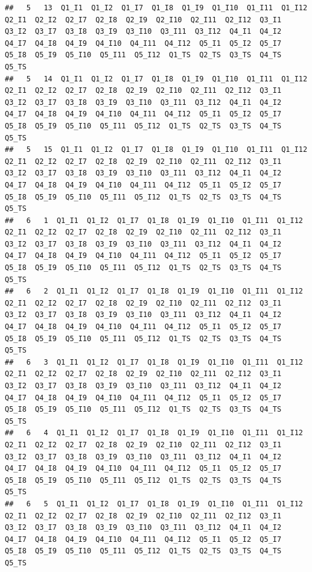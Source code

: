 \documentclass[
]{book}
\begin{document}
\begin{verbatim}
##   5   13  Q1_I1  Q1_I2  Q1_I7  Q1_I8  Q1_I9  Q1_I10  Q1_I11  Q1_I12  Q2_I1  Q2_I2  Q2_I7  Q2_I8  Q2_I9  Q2_I10  Q2_I11  Q2_I12  Q3_I1  Q3_I2  Q3_I7  Q3_I8  Q3_I9  Q3_I10  Q3_I11  Q3_I12  Q4_I1  Q4_I2  Q4_I7  Q4_I8  Q4_I9  Q4_I10  Q4_I11  Q4_I12  Q5_I1  Q5_I2  Q5_I7  Q5_I8  Q5_I9  Q5_I10  Q5_I11  Q5_I12  Q1_TS  Q2_TS  Q3_TS  Q4_TS  Q5_TS
##   5   14  Q1_I1  Q1_I2  Q1_I7  Q1_I8  Q1_I9  Q1_I10  Q1_I11  Q1_I12  Q2_I1  Q2_I2  Q2_I7  Q2_I8  Q2_I9  Q2_I10  Q2_I11  Q2_I12  Q3_I1  Q3_I2  Q3_I7  Q3_I8  Q3_I9  Q3_I10  Q3_I11  Q3_I12  Q4_I1  Q4_I2  Q4_I7  Q4_I8  Q4_I9  Q4_I10  Q4_I11  Q4_I12  Q5_I1  Q5_I2  Q5_I7  Q5_I8  Q5_I9  Q5_I10  Q5_I11  Q5_I12  Q1_TS  Q2_TS  Q3_TS  Q4_TS  Q5_TS
##   5   15  Q1_I1  Q1_I2  Q1_I7  Q1_I8  Q1_I9  Q1_I10  Q1_I11  Q1_I12  Q2_I1  Q2_I2  Q2_I7  Q2_I8  Q2_I9  Q2_I10  Q2_I11  Q2_I12  Q3_I1  Q3_I2  Q3_I7  Q3_I8  Q3_I9  Q3_I10  Q3_I11  Q3_I12  Q4_I1  Q4_I2  Q4_I7  Q4_I8  Q4_I9  Q4_I10  Q4_I11  Q4_I12  Q5_I1  Q5_I2  Q5_I7  Q5_I8  Q5_I9  Q5_I10  Q5_I11  Q5_I12  Q1_TS  Q2_TS  Q3_TS  Q4_TS  Q5_TS
##   6   1  Q1_I1  Q1_I2  Q1_I7  Q1_I8  Q1_I9  Q1_I10  Q1_I11  Q1_I12  Q2_I1  Q2_I2  Q2_I7  Q2_I8  Q2_I9  Q2_I10  Q2_I11  Q2_I12  Q3_I1  Q3_I2  Q3_I7  Q3_I8  Q3_I9  Q3_I10  Q3_I11  Q3_I12  Q4_I1  Q4_I2  Q4_I7  Q4_I8  Q4_I9  Q4_I10  Q4_I11  Q4_I12  Q5_I1  Q5_I2  Q5_I7  Q5_I8  Q5_I9  Q5_I10  Q5_I11  Q5_I12  Q1_TS  Q2_TS  Q3_TS  Q4_TS  Q5_TS
##   6   2  Q1_I1  Q1_I2  Q1_I7  Q1_I8  Q1_I9  Q1_I10  Q1_I11  Q1_I12  Q2_I1  Q2_I2  Q2_I7  Q2_I8  Q2_I9  Q2_I10  Q2_I11  Q2_I12  Q3_I1  Q3_I2  Q3_I7  Q3_I8  Q3_I9  Q3_I10  Q3_I11  Q3_I12  Q4_I1  Q4_I2  Q4_I7  Q4_I8  Q4_I9  Q4_I10  Q4_I11  Q4_I12  Q5_I1  Q5_I2  Q5_I7  Q5_I8  Q5_I9  Q5_I10  Q5_I11  Q5_I12  Q1_TS  Q2_TS  Q3_TS  Q4_TS  Q5_TS
##   6   3  Q1_I1  Q1_I2  Q1_I7  Q1_I8  Q1_I9  Q1_I10  Q1_I11  Q1_I12  Q2_I1  Q2_I2  Q2_I7  Q2_I8  Q2_I9  Q2_I10  Q2_I11  Q2_I12  Q3_I1  Q3_I2  Q3_I7  Q3_I8  Q3_I9  Q3_I10  Q3_I11  Q3_I12  Q4_I1  Q4_I2  Q4_I7  Q4_I8  Q4_I9  Q4_I10  Q4_I11  Q4_I12  Q5_I1  Q5_I2  Q5_I7  Q5_I8  Q5_I9  Q5_I10  Q5_I11  Q5_I12  Q1_TS  Q2_TS  Q3_TS  Q4_TS  Q5_TS
##   6   4  Q1_I1  Q1_I2  Q1_I7  Q1_I8  Q1_I9  Q1_I10  Q1_I11  Q1_I12  Q2_I1  Q2_I2  Q2_I7  Q2_I8  Q2_I9  Q2_I10  Q2_I11  Q2_I12  Q3_I1  Q3_I2  Q3_I7  Q3_I8  Q3_I9  Q3_I10  Q3_I11  Q3_I12  Q4_I1  Q4_I2  Q4_I7  Q4_I8  Q4_I9  Q4_I10  Q4_I11  Q4_I12  Q5_I1  Q5_I2  Q5_I7  Q5_I8  Q5_I9  Q5_I10  Q5_I11  Q5_I12  Q1_TS  Q2_TS  Q3_TS  Q4_TS  Q5_TS
##   6   5  Q1_I1  Q1_I2  Q1_I7  Q1_I8  Q1_I9  Q1_I10  Q1_I11  Q1_I12  Q2_I1  Q2_I2  Q2_I7  Q2_I8  Q2_I9  Q2_I10  Q2_I11  Q2_I12  Q3_I1  Q3_I2  Q3_I7  Q3_I8  Q3_I9  Q3_I10  Q3_I11  Q3_I12  Q4_I1  Q4_I2  Q4_I7  Q4_I8  Q4_I9  Q4_I10  Q4_I11  Q4_I12  Q5_I1  Q5_I2  Q5_I7  Q5_I8  Q5_I9  Q5_I10  Q5_I11  Q5_I12  Q1_TS  Q2_TS  Q3_TS  Q4_TS  Q5_TS

\end{verbatim}
\end{document}
